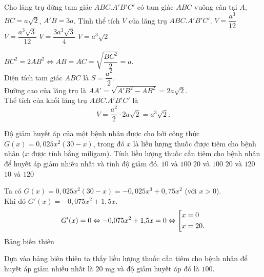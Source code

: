 \begin{ex}%
 Cho lăng trụ đứng tam giác $ABC.A'B'C'$ có tam giác $ABC$ vuông cân tại $A$, $BC = a\sqrt{2}$, $A'B = 3a$. Tính thể tích $V$ của lăng trụ $ABC.A'B'C'$.
 \choice
  {$V = \dfrac{a^3}{12}$}
  {$V = \dfrac{a^3\sqrt{3}}{12}$}
  {$V = \dfrac{3a^3\sqrt{3}}{4}$}
  {\True $V = a^3\sqrt{2}$}
 \loigiai
  {
  \immini
  {
  $BC^2 = 2AB^2 \Leftrightarrow AB = AC = \sqrt{\dfrac{BC^2}{2}} = a$.\\
  Diện tích tam giác $ABC$ là $S = \dfrac{a^2}{2}$.\\
  Đường cao của lăng trụ là $AA' = \sqrt{A'B^2 - AB^2} = 2a\sqrt{2}$.\\
  Thể tích của khối lăng trụ $ABC.A'B'C'$ là
  $$V = \dfrac{a^2}{2} \cdot 2a\sqrt{2} = a^3 \sqrt{2}.$$
  }
  {
  }
  }
\end{ex}

\begin{ex}%
 Độ giảm huyết áp của một bệnh nhân được cho bởi công thức $G(x) = 0{,}025x^2(30-x)$, trong đó $x$ là liều lượng thuốc được tiêm cho bệnh nhân ($x$ được tính bằng miligam). Tính liều lượng thuốc cần tiêm cho bệnh nhân để huyết áp giảm nhiều nhất và tính độ giảm đó.
 \choice
  {$10$ và $100$}
  {\True $20$ và $100$}
  {$20$ và $120$}
  {$10$ và $120$}
 \loigiai
  {
  Ta có $G(x) = 0{,}025x^2(30-x) = - 0{,}025x^3 + 0{,}75x^2$ (với $x > 0$).\\
  Khi đó $G'(x) = -0{,}075x^2 + 1{,}5x$.
  \begin{eqnarray*}
   G'(x) = 0 \Leftrightarrow -0{,}075x^2 + 1{,}5x = 0 \Leftrightarrow \left[\begin{aligned}& x = 0 \\& x = 20.\end{aligned}\right.
  \end{eqnarray*}
  Bảng biến thiên
  \begin{center}
  \end{center}
  Dựa vào bảng biên thiên ta thấy liều lượng thuốc cần tiêm cho bệnh nhân để huyết áp giảm nhiều nhất là $20$ mg và độ giảm huyết áp đó là $100$.
  }
\end{ex}

